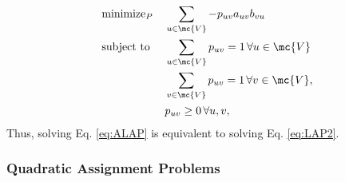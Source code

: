 \documentclass[10pt,journal,cspaper,compsoc]{IEEEtran}
\begin{document}
\begin{align}
		&\text{minimize}_P  &&\sum_{u \in \mc{V}} -p_{uv} a_{uv} b_{vu} \nonumber \\
		&\text{subject to } && \sum_{u \in \mc{V}} p_{uv} = 1 \, \forall u \in \mc{V} \nonumber \\
		& && \sum_{v \in \mc{V}} p_{uv} = 1 \, \forall v \in \mc{V}, \nonumber \\
		& &&p_{uv} \geq 0 \, \forall u,v, \label{eq:ALAP}	
\end{align}
Thus, solving Eq. \eqref{eq:ALAP} is equivalent to solving Eq. \eqref{eq:LAP2}.

	
 

\subsubsection{Quadratic Assignment Problems} %
\label{ssub:linear_assignment_problems}

\end{document}
